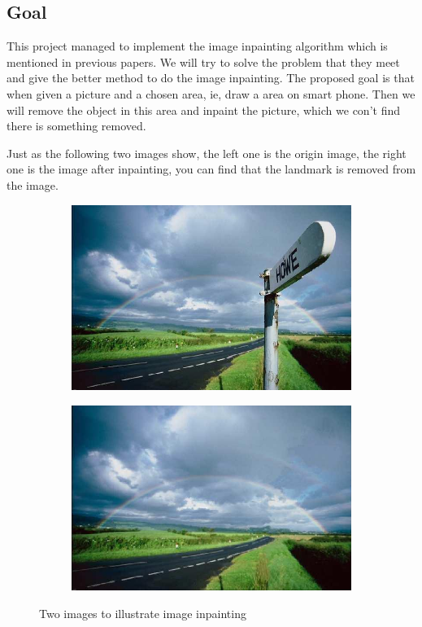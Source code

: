 \documentclass[12pt]{article}
\begin{document}
\subsection{Goal}
\qquad This project managed to implement the image inpainting algorithm which is mentioned in previous papers. We will try to solve the problem that they meet and give the better method to do the image inpainting. The proposed goal is that when given a picture and a chosen area, ie, draw a area on smart phone. Then we will remove the object in this area and inpaint the picture, which we con't find there is something removed.

\qquad Just as the following two images show, the left one is the origin image, the right one is the image after inpainting, you can find that the landmark is removed from the image.

\begin{figure}[H]
	\begin{subfigure}[pos]{.5\textwidth}
		\centering
		\includegraphics*[width=0.8\linewidth]{1.jpg}
	\end{subfigure}%
	\begin{subfigure}[pos]{.5\textwidth}
		\centering
		\includegraphics*[width=0.8\linewidth]{2.jpg}
	\end{subfigure}%
	\caption{Two images to illustrate image inpainting}
\end{figure}
 
\end{document}
